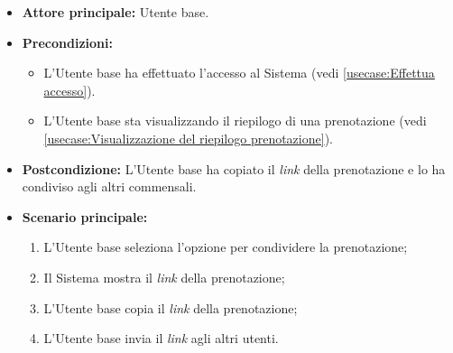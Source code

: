 \label{usecase:Condivisione della prenotazione}
\begin{itemize}
	\item \textbf{Attore principale:} Utente base.

	\item \textbf{Precondizioni:}
	\begin{itemize}
		\item L'Utente base ha effettuato l'accesso al Sistema (vedi \autoref{usecase:Effettua accesso}).
		\item L'Utente base sta visualizzando il riepilogo di una prenotazione (vedi \autoref{usecase:Visualizzazione del riepilogo prenotazione}).
	\end{itemize}

	\item \textbf{Postcondizione:}
	      L'Utente base ha copiato il \textit{link} della prenotazione e lo ha condiviso agli altri commensali.

	\item \textbf{Scenario principale:}
	      \begin{enumerate}
		      \item L'Utente base seleziona l'opzione per condividere la prenotazione;
		      \item Il Sistema mostra il \textit{link} della prenotazione;
		      \item L'Utente base copia il \textit{link} della prenotazione;
		      \item L'Utente base invia il \textit{link} agli altri utenti.
	      \end{enumerate}
\end{itemize}
